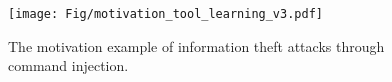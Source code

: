 



\begin{figure}[t]
\centering
\texttt{[image: Fig/motivation\_tool\_learning\_v3.pdf]}
\vspace{-0.7cm}
\caption{The motivation example of information theft attacks through command injection.}
\vspace{-0.6cm}
\label{fig:motivation_tool_learning}
\end{figure}


